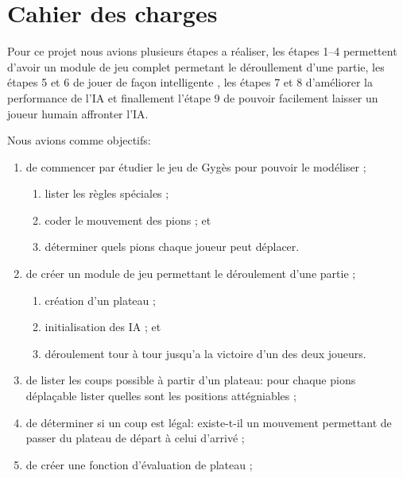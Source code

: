 \section{Cahier des charges}

	Pour ce projet nous avions plusieurs étapes a réaliser, les étapes 1--4
	permettent d'avoir un module de jeu complet permetant le déroullement d'une partie,
	les étapes 5 et 6 de jouer de façon \og{} intelligente \fg{}, les étapes
	7 et 8 d'améliorer la performance de l'IA et finallement l'étape 9 de pouvoir
	facilement laisser un joueur humain affronter l'IA.

	\vspace{1em}
	\noindent
	Nous avions comme objectifs:

	\begin{enumerate}
		\item de commencer par étudier le jeu de Gygès pour pouvoir le modéliser ;
			\begin{enumerate}%
				\item lister les règles spéciales ;
				\item coder le mouvement des pions ; et
				\item déterminer quels pions chaque joueur peut déplacer.
			\end{enumerate}

		\vspace{1em}
		\item de créer un module de jeu permettant le déroulement d'une partie ;
			\begin{enumerate}%
				\item création d'un plateau ;
				\item initialisation des IA ; et
				\item déroulement tour à tour jusqu'a la victoire d'un des deux joueurs.
			\end{enumerate}

		\vspace{1em}
		\item de lister les coups possible à partir d'un plateau:
			pour chaque pions déplaçable lister quelles sont les positions attégniables ;

		\vspace{1em}
		\item de déterminer si un coup est légal: existe-t-il un mouvement permettant
			de passer du plateau de départ à celui d'arrivé ;

		\vspace{1em}
		\item de créer une fonction d'évaluation de plateau ;


\end{enumerate}
